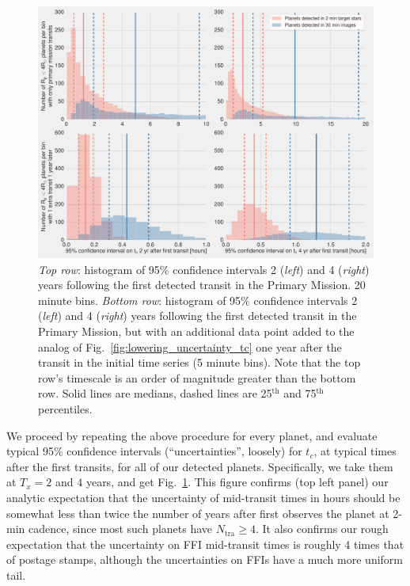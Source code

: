 \begin{figure}[!t]
	\centering
	\includegraphics[scale=1.]{figures/confidence_interval_gets_better.pdf}
	\caption{\textit{Top row}: histogram of 95\% confidence intervals 2 (\textit{left}) and 4 (\textit{right}) years following the first detected transit in the Primary Mission.
		20 minute bins.
		\textit{Bottom row}: histogram of 95\% confidence intervals 2 (\textit{left}) and 4 (\textit{right}) years following the first detected transit in the Primary Mission, but with an additional data point added to the analog of Fig.~\protect\ref{fig:lowering_uncertainty_tc} one year after the transit in the initial time series (5 minute bins).
		Note that the top row's timescale is an order of magnitude greater than the bottom row.
		Solid lines are medians, dashed lines are 25$^\mathrm{th}$ and 75$^\mathrm{th}$ percentiles.
	} %
	\label{fig:conf_interval_gets_better}
\end{figure}
We proceed by repeating the above procedure for every planet, and evaluate typical 95\% confidence intervals (``uncertainties'', loosely) for $t_c$, at typical times after the first transits, for all of our detected planets.
Specifically, we take them at $T_x=2$ and $4$ years, and get Fig.~\ref{fig:conf_interval_gets_better}.
This figure confirms (top left panel) our analytic expectation that the uncertainty of mid-transit times in hours should be somewhat less than twice the number of years after \tess first observes the planet at 2-min cadence, since most such planets have $N_\mathrm{tra}\geq4$.
It also confirms our rough expectation that the uncertainty on FFI mid-transit times is roughly 4 times that of postage stamps, although the uncertainties on FFIs have a much more uniform tail.

